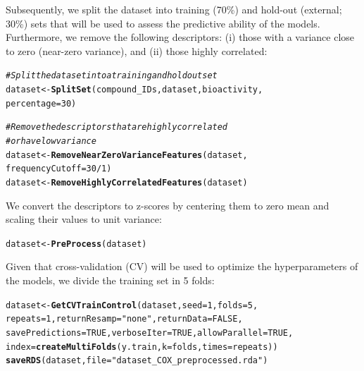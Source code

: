 \documentclass[twoside,a4wide,12pt]{article}\usepackage[]{graphicx}\usepackage[]{color}
\makeatletter
\newcommand{\hlnum}[1]{\textcolor[rgb]{0.686,0.059,0.569}{#1}}%
\newcommand{\hlstr}[1]{\textcolor[rgb]{0.192,0.494,0.8}{#1}}%
\newcommand{\hlcom}[1]{\textcolor[rgb]{0.678,0.584,0.686}{\textit{#1}}}%
\newcommand{\hlopt}[1]{\textcolor[rgb]{0,0,0}{#1}}%
\newcommand{\hlstd}[1]{\textcolor[rgb]{0.345,0.345,0.345}{#1}}%
\newcommand{\hlkwb}[1]{\textcolor[rgb]{0.69,0.353,0.396}{#1}}%
\newcommand{\hlkwc}[1]{\textcolor[rgb]{0.333,0.667,0.333}{#1}}%
\newcommand{\hlkwd}[1]{\textcolor[rgb]{0.737,0.353,0.396}{\textbf{#1}}}%
\newenvironment{kframe}{%
 \def\at@end@of@kframe{}%
 \ifinner\ifhmode%
  \def\at@end@of@kframe{\end{minipage}}%
  \begin{minipage}{\columnwidth}%
 \fi\fi%
 \def\FrameCommand##1{\hskip\@totalleftmargin \hskip-\fboxsep
 \colorbox{shadecolor}{##1}\hskip-\fboxsep
     \hskip-\linewidth \hskip-\@totalleftmargin \hskip\columnwidth}%
 \MakeFramed {\advance\hsize-\width
   \@totalleftmargin\z@ \linewidth\hsize
   \@setminipage}}%
 {\par\unskip\endMakeFramed%
 \at@end@of@kframe}
\newenvironment{knitrout}{}{} %
\makeatother
\begin{document}
Subsequently, we split the dataset into training (70\%) and hold-out (external; 30\%) sets that will be used to assess the predictive ability of the models. Furthermore, we remove the following descriptors: (i) those with a variance close to zero (near-zero variance), and (ii) those highly correlated:
\begin{knitrout}
\color{fgcolor}\begin{kframe}
\begin{alltt}
\hlcom{# Split the dataset into a training and holdout set}
\hlstd{dataset} \hlkwb{<-} \hlkwd{SplitSet}\hlstd{(compound_IDs, dataset, bioactivity,}
    \hlkwc{percentage} \hlstd{=} \hlnum{30}\hlstd{)}

\hlcom{# Remove the descriptors that are highly correlated}
\hlcom{# or have low variance}
\hlstd{dataset} \hlkwb{<-} \hlkwd{RemoveNearZeroVarianceFeatures}\hlstd{(dataset,}
    \hlkwc{frequencyCutoff} \hlstd{=} \hlnum{30}\hlopt{/}\hlnum{1}\hlstd{)}
\hlstd{dataset} \hlkwb{<-} \hlkwd{RemoveHighlyCorrelatedFeatures}\hlstd{(dataset)}
\end{alltt}
\end{kframe}
\end{knitrout}


We convert the descriptors to z-scores by centering them to zero mean and scaling their values to unit variance:
\begin{knitrout}
\color{fgcolor}\begin{kframe}
\begin{alltt}
\hlstd{dataset} \hlkwb{<-} \hlkwd{PreProcess}\hlstd{(dataset)}
\end{alltt}
\end{kframe}
\end{knitrout}


Given that cross-validation (CV) will be used to optimize the hyperparameters of the models, we divide the training set in 5 folds:
\begin{knitrout}
\color{fgcolor}\begin{kframe}
\begin{alltt}
\hlstd{dataset} \hlkwb{<-} \hlkwd{GetCVTrainControl}\hlstd{(dataset,} \hlkwc{seed} \hlstd{=} \hlnum{1}\hlstd{,} \hlkwc{folds} \hlstd{=} \hlnum{5}\hlstd{,}
    \hlkwc{repeats} \hlstd{=} \hlnum{1}\hlstd{,} \hlkwc{returnResamp} \hlstd{=} \hlstr{"none"}\hlstd{,} \hlkwc{returnData} \hlstd{=} \hlnum{FALSE}\hlstd{,}
    \hlkwc{savePredictions} \hlstd{=} \hlnum{TRUE}\hlstd{,} \hlkwc{verboseIter} \hlstd{=} \hlnum{TRUE}\hlstd{,} \hlkwc{allowParallel} \hlstd{=} \hlnum{TRUE}\hlstd{,}
    \hlkwc{index} \hlstd{=} \hlkwd{createMultiFolds}\hlstd{(y.train,} \hlkwc{k} \hlstd{= folds,} \hlkwc{times} \hlstd{= repeats))}
\hlkwd{saveRDS}\hlstd{(dataset,} \hlkwc{file} \hlstd{=} \hlstr{"dataset_COX_preprocessed.rda"}\hlstd{)}
\end{alltt}
\end{kframe}
\end{knitrout}
\end{document}
